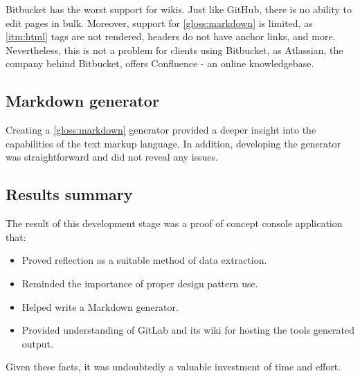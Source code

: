 Bitbucket has the worst support for wikis.
Just like GitHub, there is no ability to edit pages in bulk.
Moreover, support for \ref{gloss:markdown} is limited, as \ref{itm:html} tags are not rendered, headers do not have anchor links, and more.
Nevertheless, this is not a problem for clients using Bitbucket, as Atlassian, the company behind Bitbucket, offers Confluence - an online knowledgebase.

\subsection{Markdown generator}

Creating a \ref{gloss:markdown} generator provided a deeper insight into the capabilities of the text markup language. In addition, developing the generator was straightforward and did not reveal any issues.

\subsection{Results summary}

The result of this development stage was a proof of concept console application that:
\begin{itemize}
    \item Proved reflection as a suitable method of data extraction.
    \item Reminded the importance of proper design pattern use.
    \item Helped write a Markdown generator.
    \item Provided understanding of GitLab and its wiki for hosting the tools generated output.
\end{itemize}

Given these facts, it was undoubtedly a valuable investment of time and effort.
